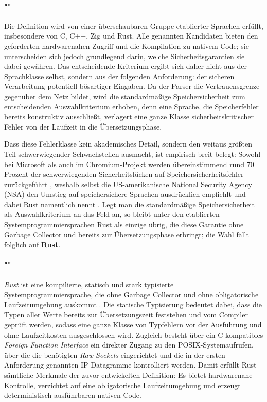 \paragraph{""}
Die Definition wird von einer überschaubaren Gruppe etablierter Sprachen erfüllt, insbesondere von C, C++,
Zig und Rust. Alle genannten Kandidaten bieten den geforderten hardwarenahen Zugriff und die Kompilation
zu nativem Code; sie unterscheiden sich jedoch grundlegend darin, welche Sicherheitsgarantien sie dabei
gewähren. Das entscheidende Kriterium ergibt sich daher nicht aus der Sprachklasse selbst, sondern aus der
folgenden Anforderung: der sicheren Verarbeitung potentiell bösartiger Eingaben. Da der Parser die
Vertrauensgrenze gegenüber dem Netz bildet, wird die standardmäßige Speichersicherheit zum entscheidenden
Auswahlkriterium erhoben, denn eine Sprache, die Speicherfehler bereits konstruktiv ausschließt, verlagert
eine ganze Klasse sicherheitskritischer Fehler von der Laufzeit in die Übersetzungsphase.

Dass diese Fehlerklasse kein akademisches Detail, sondern den weitaus größten Teil schwerwiegender
Schwachstellen ausmacht, ist empirisch breit belegt: Sowohl bei Microsoft als auch im Chromium-Projekt werden
übereinstimmend rund 70 Prozent der schwerwiegenden Sicherheitslücken auf Speichersicherheitsfehler
zurückgeführt \cite{microsoft-memory,chromium-memory}, weshalb selbst die US-amerikanische National Security
Agency (NSA) den Umstieg auf speichersichere Sprachen ausdrücklich empfiehlt und dabei Rust namentlich nennt
\cite{nsa-memory-safety}. Legt man die standardmäßige Speichersicherheit als Auswahlkriterium an das Feld an,
so bleibt unter den etablierten Systemprogrammiersprachen Rust als einzige übrig, die diese Garantie ohne
Garbage Collector und bereits zur Übersetzungsphase erbringt; die Wahl fällt folglich auf \textbf{Rust}.

\paragraph{""}
\textit{Rust} ist eine kompilierte, statisch und stark typisierte Systemprogrammiersprache, die ohne Garbage
Collector und ohne obligatorische Laufzeitumgebung auskommt \cite{rust-lang,rust-book}. Die statische Typisierung
bedeutet dabei, dass die Typen aller Werte bereits zur Übersetzungszeit feststehen und vom Compiler geprüft werden,
sodass eine ganze Klasse von Typfehlern vor der Ausführung und ohne Laufzeitkosten ausgeschlossen wird. Zugleich
besteht über ein C-kompatibles \textit{Foreign Function Interface} ein direkter Zugang zu den POSIX-Systemaufrufen,
über die die benötigten \textit{Raw Sockets} eingerichtet und die in der ersten Anforderung genannten IP-Datagramme
kontrolliert werden. Damit erfüllt Rust sämtliche Merkmale der zuvor entwickelten Definition: Es bietet hardwarenahe
Kontrolle, verzichtet auf eine obligatorische Laufzeitumgebung und erzeugt deterministisch ausführbaren nativen Code.

